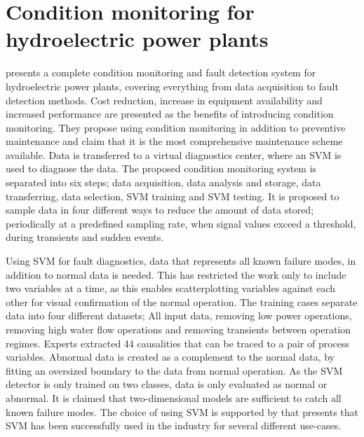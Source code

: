     \section{Condition monitoring for hydroelectric power plants}\label{sec:cm}
        \cite{Selak2014} presents a complete condition monitoring and fault detection system for hydroelectric power plants, covering everything from data acquisition to fault detection methods. Cost reduction, increase in equipment availability and increased performance are presented as the benefits of introducing condition monitoring. They propose using condition monitoring in addition to preventive maintenance and claim that it is the most comprehensive maintenance scheme available. Data is transferred to a virtual diagnostics center, where an SVM is used to diagnose the data. The proposed condition monitoring system is separated into six steps; data acquisition, data analysis and storage, data transferring, data selection, SVM training and SVM testing. It is proposed to sample data in four different ways to reduce the amount of data stored; periodically at a predefined sampling rate, when signal values exceed a threshold, during transients and sudden events. 
        
        Using SVM for fault diagnostics, data that represents all known failure modes, in addition to normal data is needed. This has restricted the work only to include two variables at a time, as this enables scatterplotting variables against each other for visual confirmation of the normal operation. The training cases separate data into four different datasets; All input data, removing low power operations, removing high water flow operations and removing transients between operation regimes. Experts extracted 44 causalities that can be traced to a pair of process variables. Abnormal data is created as a complement to the normal data, by fitting an oversized boundary to the data from normal operation. As the SVM detector is only trained on two classes, data is only evaluated as normal or abnormal. It is claimed that two-dimensional models are sufficient to catch all known failure modes. The choice of using SVM is supported by \cite{Widodo2007} that presents that SVM has been successfully used in the industry for several different use-cases. 
        
